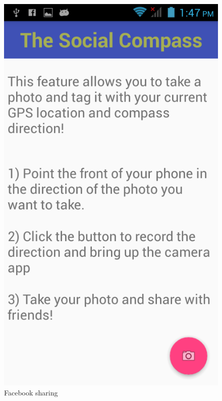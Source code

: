 \documentclass[12pt]{article}
\begin{document}
\begin{figure}[H]
\begin{minipage}[b]{.3\textwidth}
        \includegraphics[scale=1.2, width=\linewidth]{photo1.png}  
        \caption{Facebook sharing}  
    \end{minipage}  
\end{figure}




\vspace{\baselineskip}



\end{document}
